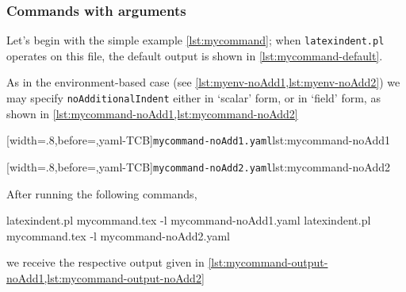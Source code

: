 \subsubsection{Commands with arguments}
Let's begin with the simple example \cref{lst:mycommand}; when \texttt{latexindent.pl} operates 
on this file, the default output is shown in \cref{lst:mycommand-default}.

\begin{minipage}{.45\textwidth}
\end{minipage}%
\hfill
\begin{minipage}{.45\textwidth}
\end{minipage}

As in the environment-based case (see \vref{lst:myenv-noAdd1,lst:myenv-noAdd2}) we may specify \texttt{noAdditionalIndent}
either in `scalar' form, or in `field' form, as shown in \cref{lst:mycommand-noAdd1,lst:mycommand-noAdd2}

\begin{minipage}{.45\textwidth}
[width=.8\linewidth,before=\centering,yaml-TCB]{\texttt{mycommand-noAdd1.yaml}}{lst:mycommand-noAdd1}
\end{minipage}
\hfill
\begin{minipage}{.45\textwidth}
[width=.8\linewidth,before=\centering,yaml-TCB]{\texttt{mycommand-noAdd2.yaml}}{lst:mycommand-noAdd2}
\end{minipage}

After running the following commands,
\begin{commandshell}
latexindent.pl mycommand.tex -l mycommand-noAdd1.yaml  
latexindent.pl mycommand.tex -l mycommand-noAdd2.yaml  
\end{commandshell}
we receive the respective output given in \cref{lst:mycommand-output-noAdd1,lst:mycommand-output-noAdd2}

\begin{minipage}{.45\textwidth}
\end{minipage}
\hfill
\begin{minipage}{.45\textwidth}
\end{minipage}

